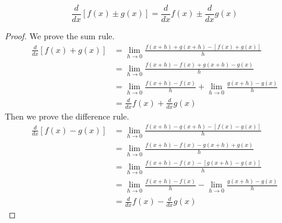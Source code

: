 \begin{theorem}
    \[\frac{d}{dx}[f(x)\pm g(x)]
    =\frac{d}{dx}f(x)\pm \frac{d}{dx}g(x)\]
\end{theorem}
\begin{proof}
    We prove the sum rule.
    \begin{align*}
        \frac{d}{dx}[f(x)+g(x)]
        &= \lim_{h\to 0}\frac{f(x+h)+g(x+h)-[f(x)+g(x)]}{h} \\
        &= \lim_{h\to 0}\frac{f(x+h)-f(x)+g(x+h)-g(x)}{h} \\
        &= \lim_{h\to 0}\frac{f(x+h)-f(x)}{h}
        +\lim_{h\to 0}\frac{g(x+h)-g(x)}{h} \\
        &= \frac{d}{dx}f(x)+\frac{d}{dx}g(x)
    \end{align*}
    Then we prove the difference rule.
    \begin{align*}
        \frac{d}{dx}[f(x)-g(x)]
        &= \lim_{h\to 0}\frac{f(x+h)-g(x+h)-[f(x)-g(x)]}{h} \\
        &= \lim_{h\to 0}\frac{f(x+h)-f(x)-g(x+h)+g(x)}{h} \\
        &= \lim_{h\to 0}\frac{f(x+h)-f(x)-[g(x+h)-g(x)]}{h} \\
        &= \lim_{h\to 0}\frac{f(x+h)-f(x)}{h}
        -\lim_{h\to 0}\frac{g(x+h)-g(x)}{h} \\
        &= \frac{d}{dx}f(x)-\frac{d}{dx}g(x)
    \end{align*}
\end{proof}

